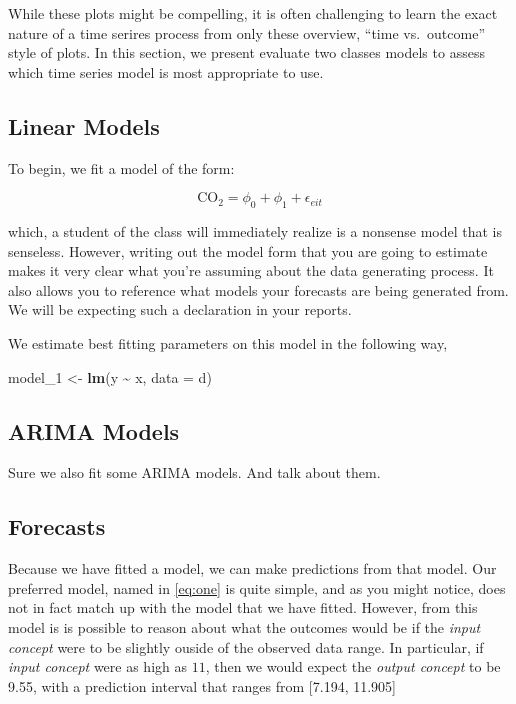 \documentclass[AER]{AEA}
\newenvironment{Shaded}{\begin{snugshade}}{\end{snugshade}}
\newcommand{\AttributeTok}[1]{\textcolor[rgb]{0.13,0.29,0.53}{#1}}
\newcommand{\FunctionTok}[1]{\textcolor[rgb]{0.13,0.29,0.53}{\textbf{#1}}}
\newcommand{\NormalTok}[1]{#1}
\newcommand{\OtherTok}[1]{\textcolor[rgb]{0.56,0.35,0.01}{#1}}
\newcommand{\SpecialCharTok}[1]{\textcolor[rgb]{0.81,0.36,0.00}{\textbf{#1}}}
\begin{document}
While these plots might be compelling, it is often challenging to learn
the exact nature of a time serires process from only these overview,
``time vs.~outcome'' style of plots. In this section, we present
evaluate two classes models to assess which time series model is most
appropriate to use.

\hypertarget{linear-models}{%
\subsection{Linear Models}\label{linear-models}}

To begin, we fit a model of the form:

\begin{equation}
\label{eq:one}
\text{CO}_{2} = \phi_{0} + \phi_{1} + \epsilon_{eit}
\end{equation}

which, a student of the class will immediately realize is a nonsense
model that is senseless. However, writing out the model form that you
are going to estimate makes it very clear what you're assuming about the
data generating process. It also allows you to reference what models
your forecasts are being generated from. We will be expecting such a
declaration in your reports.

We estimate best fitting parameters on this model in the following way,

\begin{Shaded}
\begin{Highlighting}[]
\NormalTok{model\_1 }\OtherTok{\textless{}{-}} \FunctionTok{lm}\NormalTok{(y }\SpecialCharTok{\textasciitilde{}}\NormalTok{ x, }\AttributeTok{data =}\NormalTok{ d)}
\end{Highlighting}
\end{Shaded}

\hypertarget{arima-models}{%
\subsection{ARIMA Models}\label{arima-models}}

Sure we also fit some ARIMA models. And talk about them.

\hypertarget{forecasts}{%
\subsection{Forecasts}\label{forecasts}}

Because we have fitted a model, we can make predictions from that model.
Our preferred model, named in \autoref{eq:one} is quite simple, and as
you might notice, does not in fact match up with the model that we have
fitted. However, from this model is is possible to reason about what the
outcomes would be if the \emph{input concept} were to be slightly ouside
of the observed data range. In particular, if \emph{input concept} were
as high as \(11\), then we would expect the \emph{output concept} to be
9.55, with a prediction interval that ranges from {[}7.194, 11.905{]}
\end{document}
